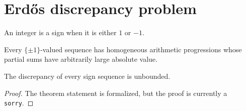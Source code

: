 \section{Erd\H{o}s discrepancy problem}

\begin{definition}
\label{def:erdos-discrepancy-sign}
\leanok
An integer is a sign when it is either $1$ or $-1$.
\end{definition}

\begin{definition}
\label{def:erdos-discrepancy-unbounded}
\leanok
{}
Every $\{\pm1\}$-valued sequence has homogeneous arithmetic progressions whose partial sums have arbitrarily large absolute value.
\end{definition}

\begin{theorem}
\label{thm:erdos-discrepancy}
\notready
{}
The discrepancy of every sign sequence is unbounded.
\end{theorem}

\begin{proof}
The theorem statement is formalized, but the proof is currently a \texttt{sorry}.
\end{proof}
